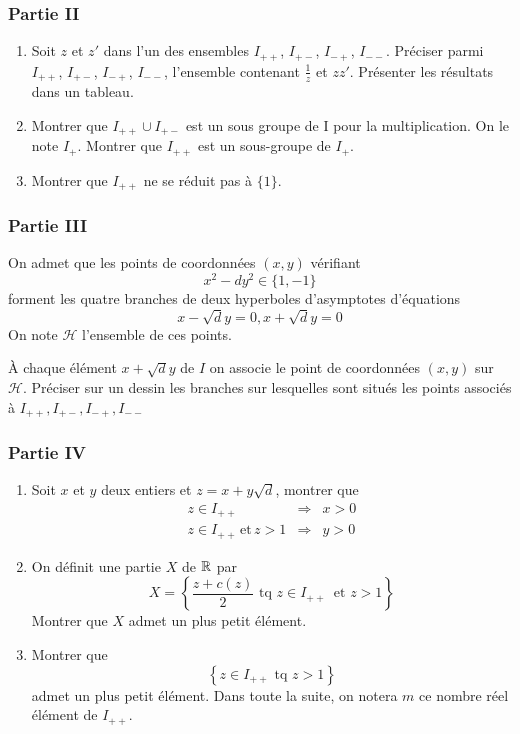 \subsubsection*{Partie II}
\begin{enumerate}
\item Soit $z$ et $z'$ dans l'un des ensembles $I_{++}$, $I_{+-}$, $I_{-+}$, $I_{--}$. Préciser parmi $I_{++}$, $I_{+-}$, $I_{-+}$, $I_{--}$, l'ensemble contenant $\frac{1}{z}$ et $zz'$. Présenter les résultats dans un tableau.
\item Montrer que $I_{++}\cup I_{+-}$ est un sous groupe de I pour la multiplication. On le note $I_{+}$. Montrer que $I_{++}$ est un sous-groupe de $I_{+}$.
\item Montrer que $ I_{++}$ ne se réduit pas à $\{1\}.$
\end{enumerate}
\subsubsection*{Partie III}
On admet que les points de coordonnées $(x,y)$ vérifiant
$$x^2-dy^2\in \{1,-1\}$$
forment les quatre branches de deux hyperboles d'asymptotes d'équations $$x-\sqrt{d}y=0, x+\sqrt{d}y=0$$
On note $\mathcal{H}$ l'ensemble de ces points.

\`A chaque élément $ x+\sqrt{d}y$ de $I$ on associe le point de coordonnées $(x,y)$ sur $\mathcal{H}$. Préciser sur un dessin les branches sur lesquelles sont situés les points associés à $I_{++}, I_{+-}, I_{-+}, I_{--}$

\subsubsection*{Partie IV}
\begin{enumerate}
\item Soit $x$ et $y$ deux entiers et $z=x+y\sqrt d$, montrer que
\begin{eqnarray*}
z\in I_{++} &\Rightarrow& x>0\\
z\in I_{++}\,\mathrm{ et }\,z>1 &\Rightarrow& y>0
\end{eqnarray*}

\item
On définit une partie $X$ de $\mathbb{R}$ par
\begin{displaymath}
 X=\left\lbrace \frac{z+c(z)}{2}\text{ tq } z\in I_{++}\,\text{ et }z>1\right\rbrace 
\end{displaymath}
Montrer que $X$ admet un plus petit élément.

\item Montrer que 
\begin{displaymath}
\left\lbrace z\in I_{++} \text{ tq } z>1\right\rbrace 
\end{displaymath}
admet un plus petit élément.\newline
Dans toute la suite, on notera $m$ ce nombre réel élément de $I_{++}$.
\end{enumerate}

